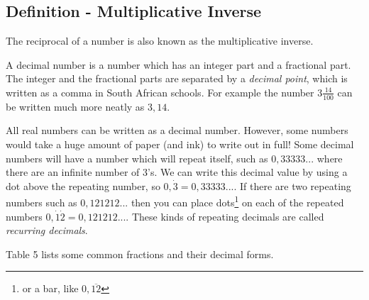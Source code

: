             \subsection{  Definition - Multiplicative Inverse }
            \nopagebreak
      \label{m38346*id177229}The reciprocal of a number is
also known as the multiplicative inverse. \par 
      \label{m38346*id177241}A decimal number is a number which has an integer part and a fractional part.
The integer and the fractional parts are separated by a \textsl{decimal point},
which is written as a comma in South African schools. For example the number $3\frac{14}{100}$ can be written much more neatly as $3,14$.\par 
      \label{m38346*id177283}All real numbers can be written as a decimal number. However, some numbers would
take a huge amount of paper (and ink) to write out in full! Some decimal numbers
will have a number which will repeat itself, such as $0,33333...$ where there
are an infinite number of 3's. We can write this decimal value by using a dot
above the repeating number, so $0,\dot{3}=0,33333...$. If there are two
repeating numbers such as $0,121212...$ then you can place dots\label{m38346*uid49}\footnote{or a
bar, like $0,\overline{12}$} on each of the repeated numbers
$0,\dot{1}\dot{2}=0,121212...$. These kinds of repeating decimals are called
\textsl{recurring decimals}.\par 
      \label{m38346*id177428}Table 5 lists some common fractions and their
decimal forms.\par 
